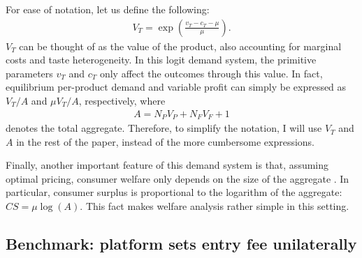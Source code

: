 \documentclass[a4paper]{article}
\begin{document}
For ease of notation, let us define the following:
\begin{align*}
    V_T = \exp \left( \frac{v_T - c_T - \mu}{\mu} \right).
\end{align*}
$V_T$ can be thought of as the value of the product, also accounting for marginal costs and taste heterogeneity.
In this logit demand system, the primitive parameters $v_T$ and $c_T$ only affect the outcomes through this value.
In fact, equilibrium per-product demand and variable profit can simply be expressed as $V_T/ A$ and $\mu V_T/ A$, respectively, where
\begin{align}
    A = N_P V_P + N_F V_F + 1
    \label{eq:aggregate_simple}
\end{align}
denotes the total aggregate.
Therefore, to simplify the notation, I will use $V_T$ and $A$ in the rest of the paper, instead of the more cumbersome expressions.

Finally, another important feature of this demand system is that, assuming optimal pricing, consumer welfare only depends on the size of the aggregate \parencite{anderson2020aggregative}.
In particular, consumer surplus is proportional to the logarithm of the aggregate: $CS = \mu \log(A)$. This fact makes welfare analysis rather simple in this setting.

\subsection{Benchmark: platform sets entry fee unilaterally}
\label{sec:results_benchmark}
\end{document}
